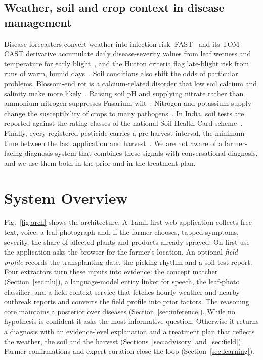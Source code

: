 \documentclass[conference]{IEEEtran}
\begin{document}
\subsection{Weather, soil and crop context in disease management}
Disease forecasters convert weather into infection risk. FAST~\cite{madden1978} and its TOM-CAST derivative accumulate daily disease-severity values from leaf wetness and temperature for early blight~\cite{frost2015}, and the Hutton criteria flag late-blight risk from runs of warm, humid days~\cite{ahdb_hutton}. Soil conditions also shift the odds of particular problems. Blossom-end rot is a calcium-related disorder that low soil calcium and salinity make more likely~\cite{howhite2005,saure2001}. Raising soil pH and supplying nitrate rather than ammonium nitrogen suppresses Fusarium wilt~\cite{jones1981}. Nitrogen and potassium supply change the susceptibility of crops to many pathogens~\cite{dordas2008}. In India, soil tests are reported against the rating classes of the national Soil Health Card scheme~\cite{shc,muhr1965,lindsay1978}. Finally, every registered pesticide carries a pre-harvest interval, the minimum time between the last application and harvest~\cite{cibrc}. We are not aware of a farmer-facing diagnosis system that combines these signals with conversational diagnosis, and we use them both in the prior and in the treatment plan.

\section{System Overview}
\label{sec:overview}

Fig.~\ref{fig:arch} shows the architecture. A Tamil-first web application collects free text, voice, a leaf photograph and, if the farmer chooses, tapped symptoms, severity, the share of affected plants and products already sprayed. On first use the application asks the browser for the farmer's location. An optional \emph{field profile} records the transplanting date, the picking rhythm and a soil-test report. Four extractors turn these inputs into evidence: the concept matcher (Section~\ref{sec:nlu}), a language-model entity linker for speech, the leaf-photo classifier, and a field-context service that fetches hourly weather and nearby outbreak reports and converts the field profile into prior factors. The reasoning core maintains a posterior over diseases (Section~\ref{sec:inference}). While no hypothesis is confident it asks the most informative question. Otherwise it returns a diagnosis with an evidence-level explanation and a treatment plan that reflects the weather, the soil and the harvest (Sections~\ref{sec:advisory} and~\ref{sec:field}). Farmer confirmations and expert curation close the loop (Section~\ref{sec:learning}).
\end{document}
